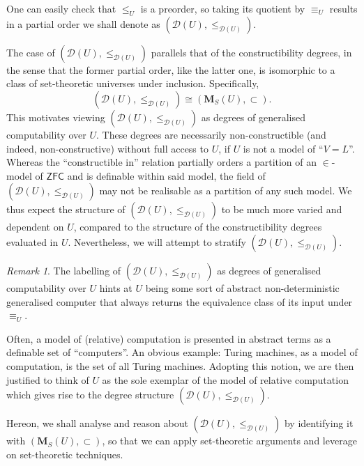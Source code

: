 \documentclass[12pt, twoside]{memoir}
\numberwithin{equation}{section}
\theoremstyle{definition}
\theoremstyle{remark}
\newtheorem{rem}[thm]{Remark}
\theoremstyle{definition}
\theoremstyle{definition}
\theoremstyle{definition}
\theoremstyle{remark}
\begin{document}
One can easily check that $\leq_U$ is a preorder, so taking its quotient by $\equiv_U$ results in a partial order we shall denote as $(\mathcal{D}(U), \leq_{\mathcal{D}(U)})$.

The case of $(\mathcal{D}(U), \leq_{\mathcal{D}(U)})$ parallels that of the constructibility degrees, in the sense that the former partial order, like the latter one, is isomorphic to a class of set-theoretic universes under inclusion. Specifically, 
\begin{equation*}
   (\mathcal{D}(U), \leq_{\mathcal{D}(U)}) \cong (\mathbf{M}_S(U), \subset) \text{.} 
\end{equation*} 
This motivates viewing $(\mathcal{D}(U), \leq_{\mathcal{D}(U)})$ as degrees of generalised computability over $U$. These degrees are necessarily non-constructible (and indeed, non-constructive) without full access to $U$, if $U$ is not a model of ``$V = L$''. Whereas the ``constructible in'' relation partially orders a partition of an $\in$-model of $\mathsf{ZFC}$ and is definable within said model, the field of $(\mathcal{D}(U), \leq_{\mathcal{D}(U)})$ may not be realisable as a partition of any such model. We thus expect the structure of $(\mathcal{D}(U), \leq_{\mathcal{D}(U)})$ to be much more varied and dependent on $U$, compared to the structure of the constructibility degrees evaluated in $U$. Nevertheless, we will attempt to stratify $(\mathcal{D}(U), \leq_{\mathcal{D}(U)})$.

\begin{rem}\label{rem9112}
The labelling of $(\mathcal{D}(U), \leq_{\mathcal{D}(U)})$ as degrees of generalised computability over $U$ hints at $U$ being some sort of abstract non-deterministic generalised computer that always returns the equivalence class of its input under $\equiv_U$. 

Often, a model of (relative) computation is presented in abstract terms as a definable set of ``computers''. An obvious example: Turing machines, as a model of computation, is the set of all Turing machines. Adopting this notion, we are then justified to think of $U$ as the sole exemplar of the model of relative computation which gives rise to the degree structure $(\mathcal{D}(U), \leq_{\mathcal{D}(U)})$.
\end{rem}

Hereon, we shall analyse and reason about $(\mathcal{D}(U), \leq_{\mathcal{D}(U)})$ by identifying it with $(\mathbf{M}_S(U), \subset)$, so that we can apply set-theoretic arguments and leverage on set-theoretic techniques.
\end{document}
